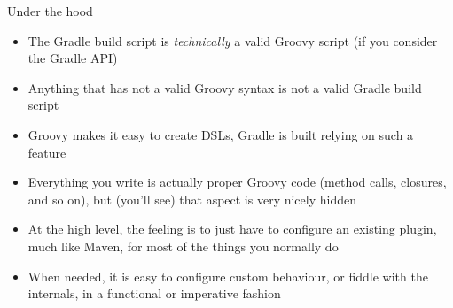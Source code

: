 \documentclass[presentation]{beamer}
\begin{document}
\begin{frame}[fragile]{Under the hood}
	\begin{itemize}
		\item The Gradle build script is \textit{technically} a valid Groovy script (if you consider the Gradle API)
		\item Anything that has not a valid Groovy syntax is not a valid Gradle build script
		\item Groovy makes it easy to create DSLs, Gradle is built relying on such a feature
		\item Everything you write is actually proper Groovy code (method calls, closures, and so on), but (you'll see) that aspect is very nicely hidden
		\item At the high level, the feeling is to just have to configure an existing plugin, much like Maven, for most of the things you normally do
		\item When needed, it is easy to configure custom behaviour, or fiddle with the internals, in a functional or imperative fashion
	\end{itemize}
\end{frame}
\end{document}
